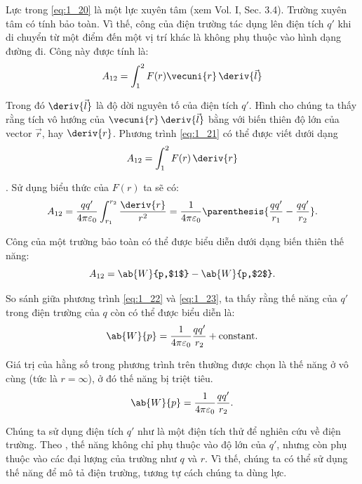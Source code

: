 Lực trong \eqref{eq:1_20} là một lực xuyên tâm (xem Vol. I, Sec. 3.4). Trường xuyên tâm có tính bảo toàn. Vì thế, công của điện trường tác dụng lên điện tích $q'$ khi di chuyển từ một điểm đến một vị trí khác là không phụ thuộc vào hình dạng đường đi. Công này được tính là:
\begin{equation}\label{eq:1_21}
	A_{12} = \int_1^2 F(r) \vecuni{r}\, \deriv{\vec{l}}
\end{equation}

\noindent
Trong đó $\deriv{\vec{l}}$ là độ dời nguyên tố của điện tích $q'$. Hình  cho chúng ta thấy rằng tích vô hướng của $\vecuni{r}\,\deriv{\vec{l}}$ bằng với biến thiên độ lớn của vector $\vec{r}$, hay $\deriv{r}$. Phương trình \eqref{eq:1_21} có thể được viết dưới dạng
\begin{equation*}
	A_{12} = \int_1^2 F(r)\, \deriv{r}
\end{equation*}

. Sử dụng biểu thức của $F(r)$ ta sẽ có:
\begin{equation}\label{eq:1_22}
	A_{12} = \frac{qq'}{4\pi\varepsilon_0} \int_{r_1}^{r_2} \frac{\deriv{r}}{r^2} = \frac{1}{4\pi\varepsilon_0} \parenthesis{
	\frac{qq'}{r_1} - \frac{qq'}{r_2}
	}.
\end{equation}

Công của một trường bảo toàn có thể được biểu diễn dưới dạng biến thiên thế năng:
\begin{equation}\label{eq:1_23}
	A_{12} = \ab{W}{p,$1$} - \ab{W}{p,$2$}.
\end{equation}

\noindent
So sánh giữa phương trình \eqref{eq:1_22} và \eqref{eq:1_23}, ta thấy rằng thế năng của $q'$ trong điện trường của $q$ còn có thể được biểu diễn là:
\begin{equation*}
	\ab{W}{p} = \frac{1}{4\pi\varepsilon_0} \frac{qq'}{r_2} + \text{constant}.
\end{equation*}

\noindent
Giá trị của hằng số trong phương trình trên thường được chọn là thế năng ở vô cùng (tức là $r=\infty$), ở đó thế năng bị triệt tiêu.
\begin{equation}\label{eq:1_24}
	\ab{W}{p} = \frac{1}{4\pi\varepsilon_0} \frac{qq'}{r_2}.
\end{equation}

Chúng ta sử dụng điện tích $q'$ như là một điện tích thử để nghiên cứu về điện trường. Theo , thế năng không chỉ phụ thuộc vào độ lớn của $q'$, nhưng còn phụ thuộc vào các đại lượng của trường như $q$ và $r$. Vì thế, chúng ta có thể sử dụng thế năng để mô tả điện trường, tương tự cách chúng ta dùng lực.

